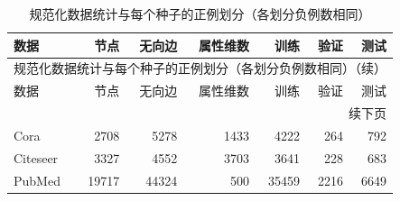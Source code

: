 {\small
\setlength{\tabcolsep}{3.2pt}
\renewcommand{\arraystretch}{1.10}
\begin{longtable}{lrrrrrr}
\caption{规范化数据统计与每个种子的正例划分（各划分负例数相同）}\\
\toprule
数据 & 节点 & 无向边 & 属性维数 & 训练 & 验证 & 测试 \\
\midrule
\endfirsthead
\multicolumn{7}{l}{规范化数据统计与每个种子的正例划分（各划分负例数相同）（续）}\\
\toprule
数据 & 节点 & 无向边 & 属性维数 & 训练 & 验证 & 测试 \\
\midrule
\endhead
\midrule\multicolumn{7}{r}{续下页}\\
\endfoot
\bottomrule
\endlastfoot
Cora & 2708 & 5278 & 1433 & 4222 & 264 & 792 \\
Citeseer & 3327 & 4552 & 3703 & 3641 & 228 & 683 \\
PubMed & 19717 & 44324 & 500 & 35459 & 2216 & 6649 \\
\end{longtable}
}
